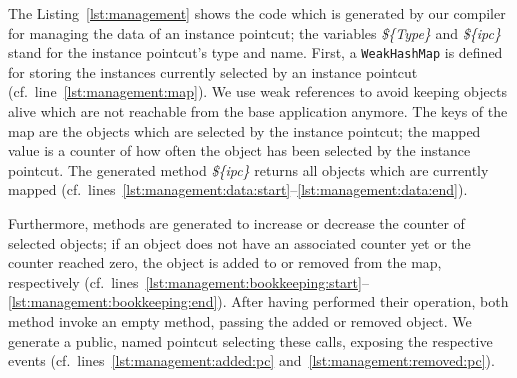\documentclass{acm_proc_article-sp}
\begin{document}
The Listing~\ref{lst:management} shows the code which is generated by our compiler for managing the data of an instance pointcut; the variables \emph{\$\{Type\}} and \emph{\$\{ipc\}} stand for the instance pointcut's type and name.
First, a \lstinline{WeakHashMap} is defined for storing the instances currently selected by an instance pointcut (cf.\ line~\ref{lst:management:map}).
We use weak references to avoid keeping objects alive which are not reachable from the base application anymore.
The keys of the map are the objects which are selected by the instance pointcut; the mapped value is a counter of how often the object has been selected by the instance pointcut.
The generated method \emph{\$\{ipc\}} returns all objects which are currently mapped (cf.\ lines~\ref{lst:management:data:start}--\ref{lst:management:data:end}).

Furthermore, methods are generated to increase or decrease the counter of selected objects; if an object does not have an associated counter yet or the counter reached zero, the object is added to or removed from the map, respectively (cf.\ lines~\ref{lst:management:bookkeeping:start}--\ref{lst:management:bookkeeping:end}).
After having performed their operation, both method invoke an empty method, passing the added or removed object.
We generate a public, named pointcut selecting these calls, exposing the respective events (cf.\ lines~\ref{lst:management:added:pc} and~\ref{lst:management:removed:pc}).
\end{document}
